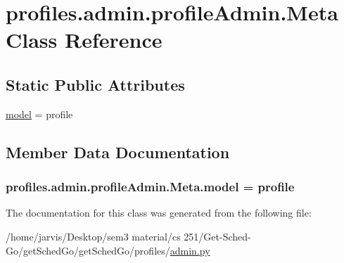 \hypertarget{classprofiles_1_1admin_1_1profileAdmin_1_1Meta}{}\section{profiles.\+admin.\+profile\+Admin.\+Meta Class Reference}
\label{classprofiles_1_1admin_1_1profileAdmin_1_1Meta}
\subsection*{Static Public Attributes}
\begin{DoxyCompactItemize}
\item 
\hyperlink{classprofiles_1_1admin_1_1profileAdmin_1_1Meta_a14ba766d71faeb3a85f86844dac3f05b}{model} = profile
\end{DoxyCompactItemize}


\subsection{Member Data Documentation}
\subsubsection[{\texorpdfstring{model}{model}}]{\setlength{\rightskip}{0pt plus 5cm}profiles.\+admin.\+profile\+Admin.\+Meta.\+model = profile\hspace{0.3cm}{\ttfamily [static]}}\hypertarget{classprofiles_1_1admin_1_1profileAdmin_1_1Meta_a14ba766d71faeb3a85f86844dac3f05b}{}\label{classprofiles_1_1admin_1_1profileAdmin_1_1Meta_a14ba766d71faeb3a85f86844dac3f05b}


The documentation for this class was generated from the following file\+:\begin{DoxyCompactItemize}
\item 
/home/jarvis/\+Desktop/sem3 material/cs 251/\+Get-\/\+Sched-\/\+Go/get\+Sched\+Go/get\+Sched\+Go/profiles/\hyperlink{profiles_2admin_8py}{admin.\+py}\end{DoxyCompactItemize}
